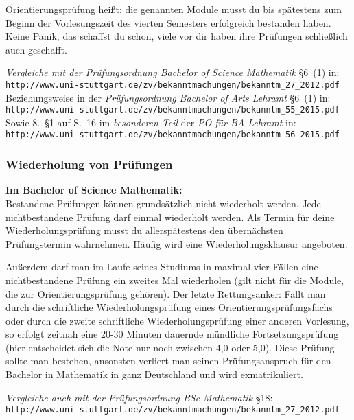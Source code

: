 Orientierungsprüfung heißt: die genannten Module
musst du bis spätestens zum Beginn der Vorlesungszeit
des vierten Semesters erfolgreich bestanden haben.
Keine Panik, das schaffst du schon,
viele vor dir haben ihre Prüfungen
schließlich auch geschafft.

{\it Vergleiche mit der Prüfungsordnung Bachelor of Science Mathematik} §6~(1) in:\\
{\small
\verb|http://www.uni-stuttgart.de/zv/bekanntmachungen/bekanntm_27_2012.pdf|}\\
Beziehungsweise in der {\it Prüfungsordnung Bachelor of Arts Lehramt} §6~(1) in:\\
{\small
\verb|http://www.uni-stuttgart.de/zv/bekanntmachungen/bekanntm_55_2015.pdf|}\\
Sowie 8.~§1 auf S.\ 16 im {\it besonderen Teil} der {\it PO für BA Lehramt} in:\\
{\small
\verb|http://www.uni-stuttgart.de/zv/bekanntmachungen/bekanntm_56_2015.pdf|}

\subsubsection{Wiederholung von Prüfungen}\label{sssec:wi}

{\bf Im Bachelor of Science Mathematik:}\\
Bestandene Prüfungen können grundsätzlich nicht wiederholt werden.
Jede nichtbestandene Prüfung darf einmal wiederholt werden.
Als Termin für deine Wiederholungsprüfung
musst du allerspätestens den übernächsten Prüfungstermin wahrnehmen.
Häufig wird eine Wiederholungsklausur angeboten.

Außerdem darf man im Laufe seines Studiums
in maximal vier Fällen eine nichtbestandene Prüfung
ein zweites Mal wiederholen (gilt nicht für die Module,
die zur Orientierungsprüfung gehören).
Der letzte Rettungsanker:
Fällt man durch die schriftliche Wiederholungsprüfung
eines Orientierungsprüfungsfachs
oder durch die zweite schriftliche Wiederholungsprüfung
einer anderen Vorlesung, so erfolgt zeitnah eine 20-30 Minuten
dauernde mündliche Fortsetzungsprüfung (hier entscheidet sich die Note
nur noch zwischen 4,0 oder 5,0).
Diese Prüfung sollte man bestehen, ansonsten verliert man seinen Prüfungsanspruch
für den Bachelor in Mathematik
in ganz Deutschland und wird exmatrikuliert.

{\it Vergleiche auch mit der Prüfungsordnung BSc Mathematik} §18:\\
{\small
\verb|http://www.uni-stuttgart.de/zv/bekanntmachungen/bekanntm_27_2012.pdf|}

